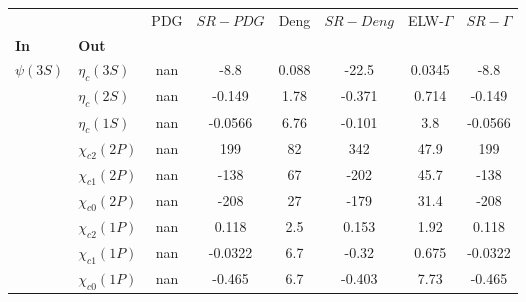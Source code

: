 \begin{tabular}{l|l|c|c|c|c|c|c}
\toprule
           &                 &  PDG &  $SR-PDG$ &  Deng &  $SR-Deng$ &  ELW-$\Gamma$ &  $SR-\Gamma$ \\
\textbf{In} & \textbf{Out} &      &           &       &            &               &              \\
\midrule
\textbf{$\psi(3S)$} & \textbf{$\eta_{c}(3S)$} &  nan &      -8.8 & 0.088 &      -22.5 &        0.0345 &         -8.8 \\
           & \textbf{$\eta_{c}(2S)$} &  nan &    -0.149 &  1.78 &     -0.371 &         0.714 &       -0.149 \\
           & \textbf{$\eta_{c}(1S)$} &  nan &   -0.0566 &  6.76 &     -0.101 &           3.8 &      -0.0566 \\
           & \textbf{$\chi_{c2}(2P)$} &  nan &       199 &    82 &        342 &          47.9 &          199 \\
           & \textbf{$\chi_{c1}(2P)$} &  nan &      -138 &    67 &       -202 &          45.7 &         -138 \\
           & \textbf{$\chi_{c0}(2P)$} &  nan &      -208 &    27 &       -179 &          31.4 &         -208 \\
           & \textbf{$\chi_{c2}(1P)$} &  nan &     0.118 &   2.5 &      0.153 &          1.92 &        0.118 \\
           & \textbf{$\chi_{c1}(1P)$} &  nan &   -0.0322 &   6.7 &      -0.32 &         0.675 &      -0.0322 \\
           & \textbf{$\chi_{c0}(1P)$} &  nan &    -0.465 &   6.7 &     -0.403 &          7.73 &       -0.465 \\
\bottomrule
\end{tabular}
